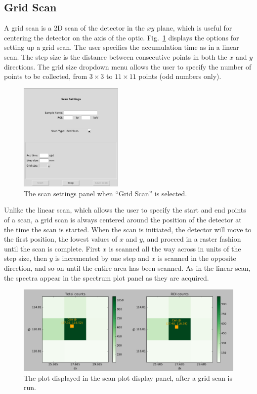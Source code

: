 \subsection{Grid Scan}

A grid scan is a 2D scan of the detector in the $xy$ plane, which is useful for centering the detector on the axis of the optic. Fig.~\ref{fig:gridscan} displays the options for setting up a grid scan. The user specifies the accumulation time as in a linear scan. The step size is the distance between consecutive points in both the $x$ and $y$ directions. The grid size dropdown menu allows the user to specify the number of points to be collected, from $3 \times 3$ to $11 \times 11$ points (odd numbers only).

\begin{figure}
\centering
\includegraphics[width=0.45\textwidth]{gridscan.png}
\caption{\label{fig:gridscan} The scan settings panel when ``Grid Scan'' is selected.}
\end{figure}

Unlike the linear scan, which allows the user to specify the start and end points of a scan, a grid scan is always centered around the position of the detector at the time the scan is started. When the scan is initiated, the detector will move to the first position, the lowest values of $x$ and $y$, and proceed in a raster fashion until the scan is complete. First $x$ is scanned all the way across in units of the step size, then $y$ is incremented by one step and $x$ is scanned in the opposite direction, and so on until the entire area has been scanned. As in the linear scan, the spectra appear in the spectrum plot panel as they are acquired.

\begin{figure}
\centering
\includegraphics[width=\textwidth]{gridplot.png}
\caption{\label{fig:gridplot} The plot displayed in the scan plot display panel, after a grid scan is run.}
\end{figure}

